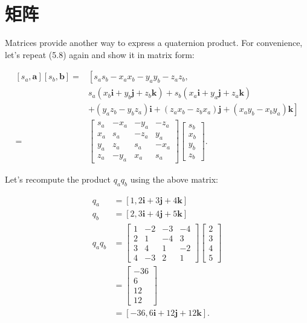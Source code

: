 \section{矩阵}
Matrices provide another way to express a quaternion product. For convenience, let's repeat (5.8) again and show it in matrix form:

$$
\begin{aligned}
{\left[s_{a}, \mathbf{a}\right]\left[s_{b}, \mathbf{b}\right]=} & {\left[s_{a} s_{b}-x_{a} x_{b}-y_{a} y_{b}-z_{a} z_{b},\right.} \\
& s_{a}\left(x_{b} \mathbf{i}+y_{b} \mathbf{j}+z_{b} \mathbf{k}\right)+s_{b}\left(x_{a} \mathbf{i}+y_{a} \mathbf{j}+z_{a} \mathbf{k}\right) \\
& \left.+\left(y_{a} z_{b}-y_{b} z_{a}\right) \mathbf{i}+\left(z_{a} x_{b}-z_{b} x_{a}\right) \mathbf{j}+\left(x_{a} y_{b}-x_{b} y_{a}\right) \mathbf{k}\right] \\
= & {\left[\begin{array}{cccc}
s_{a} & -x_{a} & -y_{a} & -z_{a} \\
x_{a} & s_{a} & -z_{a} & y_{a} \\
y_{a} & z_{a} & s_{a} & -x_{a} \\
z_{a} & -y_{a} & x_{a} & s_{a}
\end{array}\right]\left[\begin{array}{c}
s_{b} \\
x_{b} \\
y_{b} \\
z_{b}
\end{array}\right] . }
\end{aligned}
$$

Let's recompute the product $q_{a} q_{b}$ using the above matrix:

$$
\begin{aligned}
q_{a} & =[1,2 \mathbf{i}+3 \mathbf{j}+4 \mathbf{k}] \\
q_{b} & =[2,3 \mathbf{i}+4 \mathbf{j}+5 \mathbf{k}] \\
q_{a} q_{b} & =\left[\begin{array}{cccc}
1 & -2 & -3 & -4 \\
2 & 1 & -4 & 3 \\
3 & 4 & 1 & -2 \\
4 & -3 & 2 & 1
\end{array}\right]\left[\begin{array}{l}
2 \\
3 \\
4 \\
5
\end{array}\right] \\
& =\left[\begin{array}{c}
-36 \\
6 \\
12 \\
12
\end{array}\right] \\
& =[-36,6 \mathbf{i}+12 \mathbf{j}+12 \mathbf{k}] .
\end{aligned}
$$

